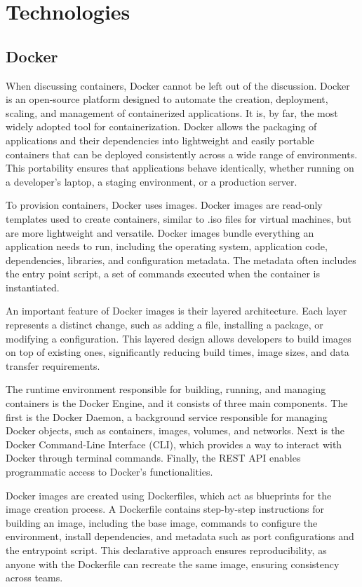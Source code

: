 \chapter{Technologies} \label{ch:technologies}

\section{Docker}
When discussing containers, Docker cannot be left out of the discussion. Docker is an open-source platform designed to automate the creation, deployment, scaling, and management of containerized applications. It is, by far, the most widely adopted tool for containerization. Docker allows the packaging of applications and their dependencies into lightweight and easily portable containers that can be deployed consistently across a wide range of environments. This portability ensures that applications behave identically, whether running on a developer's laptop, a staging environment, or a production server.

To provision containers, Docker uses images. Docker images are read-only templates used to create containers, similar to .iso files for virtual machines, but are more lightweight and versatile. Docker images bundle everything an application needs to run, including the operating system, application code, dependencies, libraries, and configuration metadata. The metadata often includes the entry point script, a set of commands executed when the container is instantiated.

An important feature of Docker images is their layered architecture. Each layer represents a distinct change, such as adding a file, installing a package, or modifying a configuration. This layered design allows developers to build images on top of existing ones, significantly reducing build times, image sizes, and data transfer requirements.

The runtime environment responsible for building, running, and managing containers is the Docker Engine, and it consists of three main components. The first is the Docker Daemon, a background service responsible for managing Docker objects, such as containers, images, volumes, and networks. Next is the Docker Command-Line Interface (CLI), which provides a way to interact with Docker through terminal commands. Finally, the REST API enables programmatic access to Docker's functionalities.

Docker images are created using Dockerfiles, which act as blueprints for the image creation process. A Dockerfile contains step-by-step instructions for building an image, including the base image, commands to configure the environment, install dependencies, and metadata such as port configurations and the entrypoint script. This declarative approach ensures reproducibility, as anyone with the Dockerfile can recreate the same image, ensuring consistency across teams.

